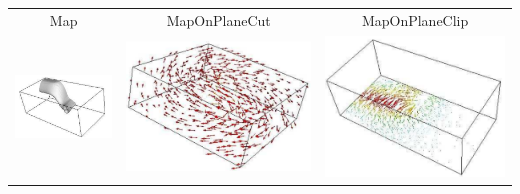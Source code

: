 \begin{table}[h]
\begin{tabular}{c c c}
Map & MapOnPlaneCut & MapOnPlaneClip \\
\includegraphics[width=\thumbnailwidth]{figures/MapOnScalarClip} & 
\includegraphics[width=\thumbnailwidth]{figures/Velocity} & 
\includegraphics[width=\thumbnailwidth]{figures/VelocityOnPlaneCut}  \\

\end{tabular}
\end{table}
